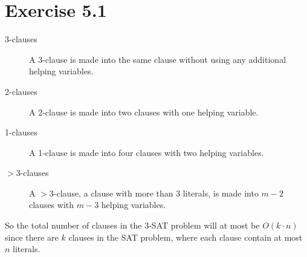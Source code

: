 \section*{Exercise 5.1}

\begin{description}
\item [3-clauses] A 3-clause is made into the same clause without using any additional helping variables.
\item [2-clauses] A 2-clause is made into two clauses with one helping variable.
\item [1-clauses] A 1-clause is made into four clauses with two helping variables.
\item [$>3$-clauses] A $>3$-clause, a clause with more than 3 literals, is made into $m-2$ clauses with $m-3$ helping variables.
\end{description}

So the total number of clauses in the 3-SAT problem will at most be $O(k \cdot n)$ since there are $k$ clauses in the SAT problem, where each clause contain at most $n$ literals.
